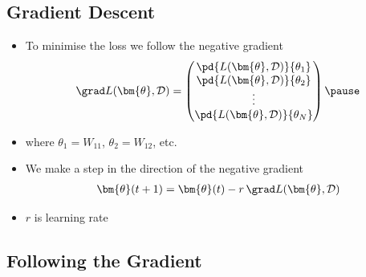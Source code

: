 \begin{slide}
\section[-1]{Gradient Descent}

\begin{PauseHighLight}
  \begin{itemize}
  \item To minimise the loss we follow the negative gradient
    \begin{align*}
      \grad L(\bm{\theta}, \mathcal{D}) =
      \begin{pmatrix}
        \pd{L(\bm{\theta}, \mathcal{D})}{\theta_1} \\
        \pd{L(\bm{\theta}, \mathcal{D})}{\theta_2} \\
        \vdots \\
        \pd{L(\bm{\theta}, \mathcal{D})}{\theta_N}
      \end{pmatrix}\pause
    \end{align*}
  \item where $\theta_1=W_{11}$, $\theta_2=W_{12}$, etc.\pause
  \item We make a step in the direction of the negative gradient
    \begin{align*}
      \bm{\theta}(t+1) = \bm{\theta}(t) - r\,\grad L(\bm{\theta}, \mathcal{D})
    \end{align*}
  \item $r$ is learning rate\pause
  \end{itemize}
\end{PauseHighLight}

\end{slide}


\begin{slide}
\section{Following the Gradient}
\pause
\pb
{}
\begin{center}
  \pause
\end{center}

\end{slide}


